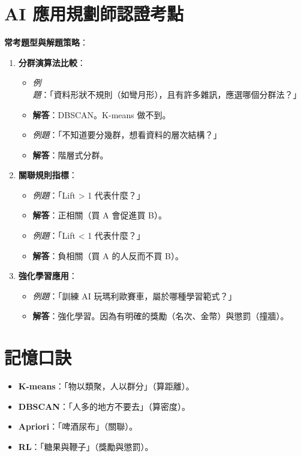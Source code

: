 \documentclass[
  letterpaper,
  DIV=11,
  numbers=noendperiod]{scrreprt}
\providecommand{\tightlist}{%
  \setlength{\itemsep}{0pt}\setlength{\parskip}{0pt}}
\begin{document}
\section{AI
應用規劃師認證考點}\label{ai-ux61c9ux7528ux898fux5283ux5e2bux8a8dux8b49ux8003ux9ede-5}

\textbf{常考題型與解題策略}：

\begin{enumerate}
\def\labelenumi{\arabic{enumi}.}
\tightlist
\item
  \textbf{分群演算法比較}：

  \begin{itemize}
  \tightlist
  \item
    \emph{例題}：「資料形狀不規則（如彎月形），且有許多雜訊，應選哪個分群法？」
  \item
    \textbf{解答}：DBSCAN。K-means 做不到。
  \item
    \emph{例題}：「不知道要分幾群，想看資料的層次結構？」
  \item
    \textbf{解答}：階層式分群。
  \end{itemize}
\item
  \textbf{關聯規則指標}：

  \begin{itemize}
  \tightlist
  \item
    \emph{例題}：「Lift \textgreater{} 1 代表什麼？」
  \item
    \textbf{解答}：正相關（買 A 會促進買 B）。
  \item
    \emph{例題}：「Lift \textless{} 1 代表什麼？」
  \item
    \textbf{解答}：負相關（買 A 的人反而不買 B）。
  \end{itemize}
\item
  \textbf{強化學習應用}：

  \begin{itemize}
  \tightlist
  \item
    \emph{例題}：「訓練 AI 玩瑪利歐賽車，屬於哪種學習範式？」
  \item
    \textbf{解答}：強化學習。因為有明確的獎勵（名次、金幣）與懲罰（撞牆）。
  \end{itemize}
\end{enumerate}

\section{記憶口訣}\label{ux8a18ux61b6ux53e3ux8a23-5}

\begin{itemize}
\tightlist
\item
  \textbf{K-means}：「物以類聚，人以群分」（算距離）。
\item
  \textbf{DBSCAN}：「人多的地方不要去」（算密度）。
\item
  \textbf{Apriori}：「啤酒尿布」（關聯）。
\item
  \textbf{RL}：「糖果與鞭子」（獎勵與懲罰）。
\end{itemize}
\end{document}

